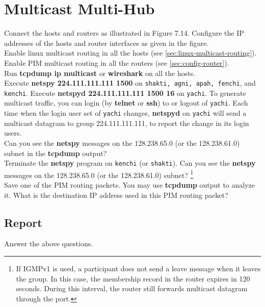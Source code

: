 \documentclass{../UTNetLab}
\begin{document}
\section{Multicast Multi-Hub}
    Connect the hosts and routers as illustrated in Figure 7.14.
    Configure the IP addresses of the hosts and router interfaces as given in the figure.\\
    Enable linux multicast routing in all the hosts (see \autoref{sec:linux-multicast-routing}).\\
    Enable PIM multicast routing in all the routers (see \autoref{sec:config-router}). \\
    Run \textbf{tcpdump ip multicast} or \textbf{wireshark} on all the hosts. \\
    Execute \textbf{netspy 224.111.111.111 1500} on \texttt{shakti, agni, apah, fenchi}, and \texttt{kenchi}.
    Execute \textbf{netspyd 224.111.111.111 1500 16} on \texttt{yachi}.
    To generate multicast traffic, you can login (by \textbf{telnet} or \textbf{ssh}) to or logout of \texttt{yachi}.
    Each time when the login user set of \texttt{yachi} changes, \textbf{netspyd} on \texttt{yachi} will send a multicast datagram to group 224.111.111.111, to report the change in its login users. \\
    Can you see the \textbf{netspy} messages on the 128.238.65.0 (or the 128.238.61.0) subnet in the \textbf{tcpdump} output? \\
    Terminate the \textbf{netspy} program on \texttt{kenchi} (or \texttt{shakti}).
    Can you see the \textbf{netspy} messages on the 128.238.65.0 (or the 128.238.61.0) subnet?
    \footnote{If IGMPv1 is used, a participant does not send a leave message when it leaves the group.
    In this case, the membership record in the router expires in 120 seconds.
    During this interval, the router still forwards multicast datagram through the port.} \\
    Save one of the PIM routing packets.
    You may use \textbf{tcpdump} output to analyze it.
    What is the destination IP address used in this PIM routing packet?
    \subsection*{Report}
    Answer the above questions.
\end{document}
